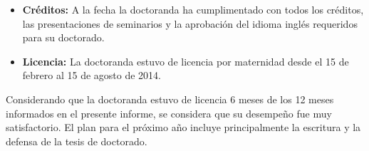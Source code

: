 \begin{itemize}
\begin{itemize}

\end{itemize}

\item  \textbf{Cr\'editos:} 
A la fecha la doctoranda ha cumplimentado con todos los cr\'editos, las presentaciones de seminarios y la aprobaci\'on del idioma ingl\'es requeridos para su doctorado.

\item  \textbf{Licencia:}
La doctoranda estuvo de licencia por maternidad desde el 15 de febrero al 15 de agosto de 2014. 

\end{itemize}

Considerando que la doctoranda estuvo de licencia 6 meses de los 12 meses informados en el presente informe, se considera que su desempe\~no fue muy satisfactorio. El plan para el pr\'oximo a\~no incluye principalmente la escritura y la defensa de la tesis de doctorado. 


